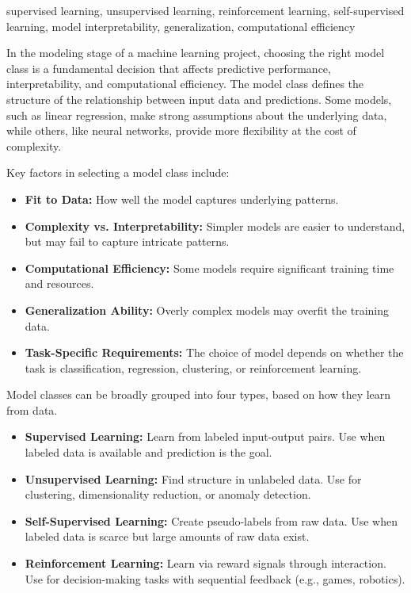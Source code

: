 \documentclass[12pt,openany]{book}
\begin{document}
\begin{keywordsbox}
supervised learning, unsupervised learning, reinforcement learning, self-supervised learning, model interpretability, generalization, computational efficiency
\end{keywordsbox}


In the modeling stage of a machine learning project, choosing the right model class is a fundamental decision that affects predictive performance, interpretability, and computational efficiency. The model class defines the structure of the relationship between input data and predictions. Some models, such as linear regression, make strong assumptions about the underlying data, while others, like neural networks, provide more flexibility at the cost of complexity.
\newline

Key factors in selecting a model class include:
\begin{itemize}
    \item \textbf{Fit to Data:} How well the model captures underlying patterns.
    \item \textbf{Complexity vs. Interpretability:} Simpler models are easier to understand, but may fail to capture intricate patterns.
    \item \textbf{Computational Efficiency:} Some models require significant training time and resources.
    \item \textbf{Generalization Ability:} Overly complex models may overfit the training data.
    \item \textbf{Task-Specific Requirements:} The choice of model depends on whether the task is classification, regression, clustering, or reinforcement learning.
\end{itemize}

Model classes can be broadly grouped into four types, based on how they learn from data.

\begin{itemize}
    \item \textbf{Supervised Learning:} Learn from labeled input-output pairs. Use when labeled data is available and prediction is the goal.
    \item \textbf{Unsupervised Learning:} Find structure in unlabeled data. Use for clustering, dimensionality reduction, or anomaly detection.
    \item \textbf{Self-Supervised Learning:} Create pseudo-labels from raw data. Use when labeled data is scarce but large amounts of raw data exist.
    \item \textbf{Reinforcement Learning:} Learn via reward signals through interaction. Use for decision-making tasks with sequential feedback (e.g., games, robotics).
\end{itemize}
\end{document}
